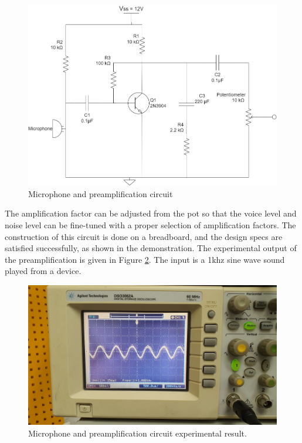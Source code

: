 \documentclass[a4paper,10pt]{IEEEtran}
\begin{document}
\begin{figure}[htbp!]
    \centering
    \includegraphics[width = 1\linewidth]{Preamplifier.drawio.png}
    \caption{Microphone and preamplification circuit}
    \label{PreAmp}
\end{figure} 
The amplification factor can be adjusted from the pot so that the voice level and noise level can be fine-tuned with a proper selection of amplification factors. The construction of this circuit is done on a breadboard, and the design specs are satisfied successfully, as shown in the demonstration. The experimental output of the preamplification is given in Figure \ref{preamp_osc}. The input is a 1khz sine wave sound played from a device.
\begin{figure}[H]
    \centering
    \includegraphics[width = 1\linewidth]{preamp_experimental.jpeg}
    \caption{Microphone and preamplification circuit experimental result.}
    \label{preamp_osc}
\end{figure} 
\end{document}
